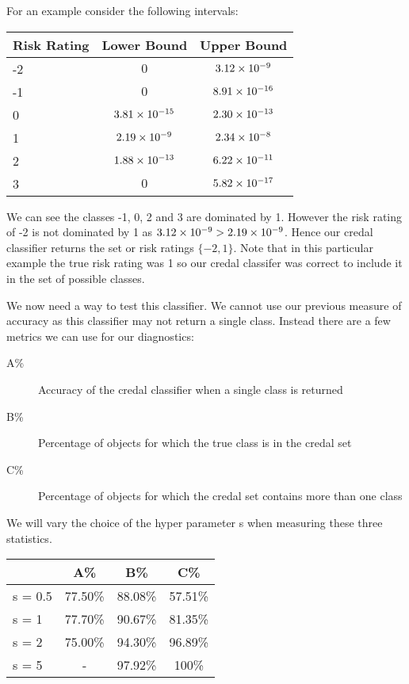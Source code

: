 For an example consider the following intervals:
\begin{center}
	\begin{tabular}{l|c c}
	Risk Rating & Lower Bound & Upper Bound \\
	\hline
	-2          & $0$              & ${3.12}\times 10^{-9}$  \\
	-1          & $0$              & ${8.91}\times 10^{-16}$ \\
	0           & ${3.81}\times 10^{-15}$ & ${2.30}\times 10^{-13}$ \\
	1           & ${2.19}\times 10^{-9}$  & ${2.34}\times 10^{-8}$  \\
	2           & ${1.88}\times 10^{-13}$ & ${6.22}\times 10^{-11}$ \\
	3           & $0$              & ${5.82}\times 10^{-17}$ \\
	\end{tabular}
\end{center}
We can see the classes -1, 0, 2 and 3 are dominated by 1.
However the risk rating of -2 is not dominated by 1 as ${3.12}\times 10^{-9} > {2.19}\times 10^{-9}$.
Hence our credal classifier returns the set or risk ratings $\{-2, 1\}$.
Note that in this particular example the true risk rating was 1 so our credal classifer was correct to include it in the set of possible classes.

We now need a way to test this classifier.
We cannot use our previous measure of accuracy as this classifier may not return a single class.
Instead there are a few metrics we can use for our diagnostics:
\begin{description}
	\item[A\%] Accuracy of the credal classifier when a single class is returned
	\item[B\%] Percentage of objects for which the true class is in the credal set
	\item[C\%] Percentage of objects for which the credal set contains more than one class
\end{description}

We will vary the choice of the hyper parameter s when measuring these three statistics.
\begin{center}
\begin{tabular}{l|c c c}
        & A\%     & B\%     & C\%     \\
\hline
s = 0.5 & 77.50\% & 88.08\% & 57.51\% \\
s = 1   & 77.70\% & 90.67\% & 81.35\% \\
s = 2   & 75.00\% & 94.30\% & 96.89\% \\
s = 5   & -       & 97.92\% & 100\%   \\
\end{tabular}
\end{center}

